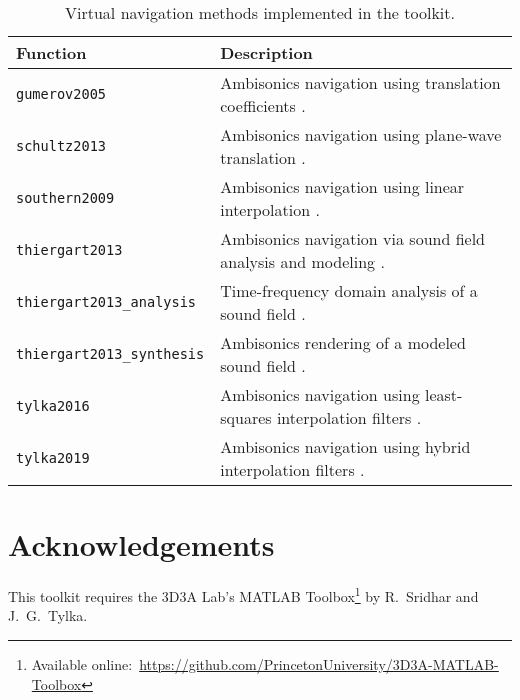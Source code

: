 \documentclass[11pt, oneside]{article}
\begin{document}
\begin{table}
\centering
  \begin{tabular}{| l | p{11cm} |}
    \hline
    \textbf{Function} & \textbf{Description} \\ \hline
    \texttt{gumerov2005} & Ambisonics navigation using translation coefficients \citep{GumerovDuraiswami2005,Zotter2009PhD}. \\ \hline
    \texttt{schultz2013} & Ambisonics navigation using plane-wave translation \citep{SchultzSpors2013}. \\ \hline
    \texttt{southern2009} & Ambisonics navigation using linear interpolation \citep{Southern2009}. \\ \hline
    \texttt{thiergart2013} & Ambisonics navigation via sound field analysis and modeling \citep{Thiergart2013}. \\ \hline
    \texttt{thiergart2013\_analysis} & Time-frequency domain analysis of a sound field \citep{Thiergart2013}. \\ \hline
    \texttt{thiergart2013\_synthesis} & Ambisonics rendering of a modeled sound field \citep{Thiergart2013}. \\ \hline
    \texttt{tylka2016} & Ambisonics navigation using least-squares interpolation filters \citep{TylkaChoueiri2016}. \\ \hline
    \texttt{tylka2019} & Ambisonics navigation using hybrid interpolation filters \citep{TylkaChoueiri2019}. \\ \hline
    \end{tabular}
    \caption{Virtual navigation methods implemented in the toolkit.}
    \label{tab:Methods}
\end{table}

\section*{Acknowledgements}
This toolkit requires the 3D3A Lab's MATLAB Toolbox\footnote{Available online:~\url{https://github.com/PrincetonUniversity/3D3A-MATLAB-Toolbox}}
by R.~Sridhar and J.~G.~Tylka.



\end{document}
